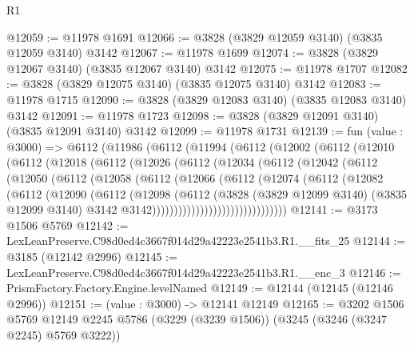\begin{lexlean}{R1}
\begin{coremodule}
@12059 := @11978 @1691
@12066 := @3828 (@3829 @12059 @3140) (@3835 @12059 @3140) @3142
@12067 := @11978 @1699
@12074 := @3828 (@3829 @12067 @3140) (@3835 @12067 @3140) @3142
@12075 := @11978 @1707
@12082 := @3828 (@3829 @12075 @3140) (@3835 @12075 @3140) @3142
@12083 := @11978 @1715
@12090 := @3828 (@3829 @12083 @3140) (@3835 @12083 @3140) @3142
@12091 := @11978 @1723
@12098 := @3828 (@3829 @12091 @3140) (@3835 @12091 @3140) @3142
@12099 := @11978 @1731
@12139 := fun (value : @3000) =>
  @6112
    (@11986
      (@6112
        (@11994
          (@6112
            (@12002
              (@6112
                (@12010
                  (@6112
                    (@12018
                      (@6112
                        (@12026
                          (@6112
                            (@12034
                              (@6112
                                (@12042
                                  (@6112
                                    (@12050
                                      (@6112
                                        (@12058
                                          (@6112
                                            (@12066
                                              (@6112
                                                (@12074
                                                  (@6112
                                                    (@12082
                                                      (@6112
                                                        (@12090
                                                          (@6112
                                                            (@12098
                                                              (@6112
                                                                (@3828
                                                                  (@3829 @12099 @3140)
                                                                  (@3835 @12099 @3140)
                                                                  @3142
                                                                  @3142)))))))))))))))))))))))))))))))
@12141 := @3173 @1506 @5769
@12142 := LexLeanPreserve.C98d0ed4c3667f014d29a42223e2541b3.R1.__fits_25
@12144 := @3185 (@12142 @2996)
@12145 := LexLeanPreserve.C98d0ed4c3667f014d29a42223e2541b3.R1.__enc_3
@12146 := PrismFactory.Factory.Engine.levelNamed
@12149 := @12144 (@12145 (@12146 @2996))
@12151 := (value : @3000) -> @12141 @12149
@12165 := @3202
    @1506
    @5769
    @12149
    @2245
    @5786
    (@3229 (@3239 @1506))
    (@3245 (@3246 (@3247 @2245) @5769 @3222))

\end{coremodule}
\end{lexlean}
